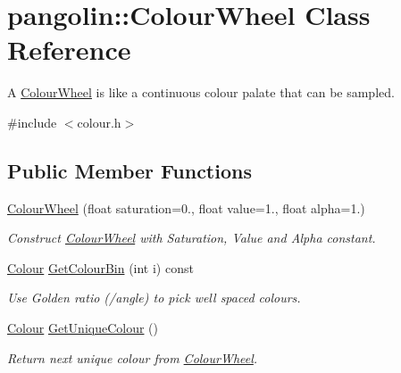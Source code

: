 \hypertarget{classpangolin_1_1_colour_wheel}{}\section{pangolin\+:\+:Colour\+Wheel Class Reference}
\label{classpangolin_1_1_colour_wheel}


A \hyperlink{classpangolin_1_1_colour_wheel}{Colour\+Wheel} is like a continuous colour palate that can be sampled.  




{\ttfamily \#include $<$colour.\+h$>$}

\subsection*{Public Member Functions}
\begin{DoxyCompactItemize}
\item 
\hyperlink{classpangolin_1_1_colour_wheel_a3ceb3513ba6cad92d6e2844671da7f43}{Colour\+Wheel} (float saturation=0., float value=1., float alpha=1.)\hypertarget{classpangolin_1_1_colour_wheel_a3ceb3513ba6cad92d6e2844671da7f43}{}\label{classpangolin_1_1_colour_wheel_a3ceb3513ba6cad92d6e2844671da7f43}

\begin{DoxyCompactList}\small\item\em Construct \hyperlink{classpangolin_1_1_colour_wheel}{Colour\+Wheel} with Saturation, Value and Alpha constant. \end{DoxyCompactList}\item 
\hyperlink{structpangolin_1_1_colour}{Colour} \hyperlink{classpangolin_1_1_colour_wheel_ac8d1538dbe99eca9eb769f3a6076ea53}{Get\+Colour\+Bin} (int i) const \hypertarget{classpangolin_1_1_colour_wheel_ac8d1538dbe99eca9eb769f3a6076ea53}{}\label{classpangolin_1_1_colour_wheel_ac8d1538dbe99eca9eb769f3a6076ea53}

\begin{DoxyCompactList}\small\item\em Use Golden ratio (/angle) to pick well spaced colours. \end{DoxyCompactList}\item 
\hyperlink{structpangolin_1_1_colour}{Colour} \hyperlink{classpangolin_1_1_colour_wheel_af6f84ad1b063c82019927fee17ceba3f}{Get\+Unique\+Colour} ()\hypertarget{classpangolin_1_1_colour_wheel_af6f84ad1b063c82019927fee17ceba3f}{}\label{classpangolin_1_1_colour_wheel_af6f84ad1b063c82019927fee17ceba3f}

\begin{DoxyCompactList}\small\item\em Return next unique colour from \hyperlink{classpangolin_1_1_colour_wheel}{Colour\+Wheel}. \end{DoxyCompactList}\end{DoxyCompactItemize}
